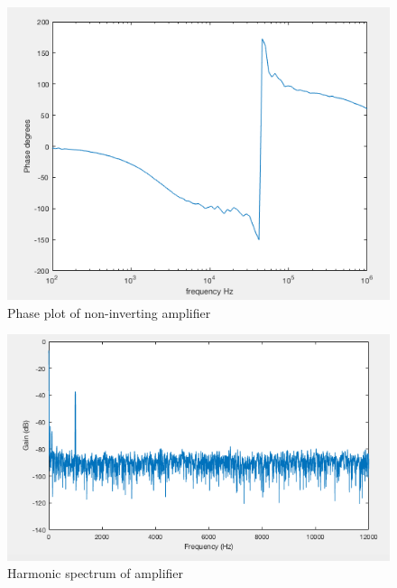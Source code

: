 			\begin{figure}[H]
		\begin{center}
			\includegraphics[scale=.40]{ExperimentalImplementation/phasenoninverting.png}
			\caption{Phase plot of non-inverting amplifier}
			\label{fig:phasenoninverting}
		\end{center}
	\end{figure}

		\begin{figure}[H]
	\begin{center}
		\includegraphics[scale=.40]{ExperimentalImplementation/spectrum.png}
		\caption{Harmonic spectrum of amplifier}
		\label{fig:spectrum}
	\end{center}
\end{figure}



	
	